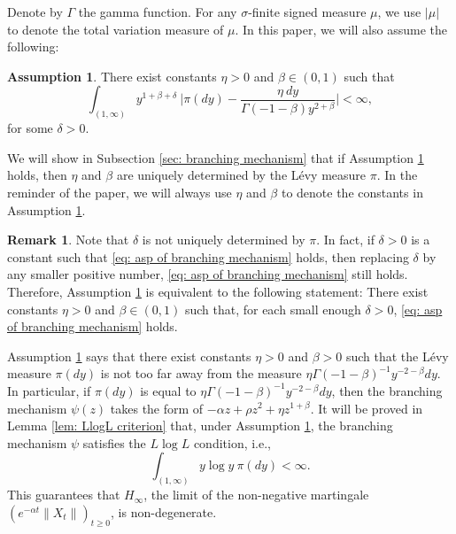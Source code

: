 \documentclass[12pt,a4paper]{amsart}
\theoremstyle{plain}
\theoremstyle{definition}
\newtheorem{rem}[thm]{Remark}
\newtheorem{asp}{Assumption}
\numberwithin{equation}{section}
\begin{document}
    Denote by $\Gamma$ the gamma function.
For any $\sigma$-finite signed measure $\mu$, we use $|\mu|$ to denote the total variation measure of $\mu$.
    In this paper, we will also assume the following:
\begin{asp}
\label{asp: branching mechanism}
    There exist constants $\eta > 0$ and $\beta \in (0,1)$ such that
\begin{equation}
\label{eq: asp of branching mechanism}
    \int_{(1,\infty)}y^{1+\beta +\delta}~\Big|\pi(dy)-\frac{\eta~dy}{\Gamma(-1-\beta)y^{2+\beta}}\Big| <\infty,
\end{equation}
	for some $\delta > 0$.
\end{asp}
	We will show in Subsection \ref{sec: branching mechanism} that if Assumption \ref{asp: branching mechanism} holds, then $\eta$ and $\beta$ are uniquely determined by the L\'evy measure $\pi$.
	In the reminder of the paper, we will always use $\eta$ and $\beta$ to denote the constants in Assumption  \ref{asp: branching mechanism}.


\begin{rem}
\label{rem: small enough delta}
	Note that $\delta$ is not uniquely determined by $\pi$.
	In fact, if $\delta>0$ is a constant such that \eqref{eq: asp of branching mechanism} holds, then replacing $\delta$ by any smaller positive number, \eqref{eq: asp of branching mechanism} still holds.
	Therefore, Assumption \ref{asp: branching mechanism} is equivalent to the following statement: 
	There exist constants $\eta > 0$ and $\beta \in (0,1)$ such that, for each small enough $\delta>0$, \eqref{eq: asp of branching mechanism} holds.
\end{rem}

    Assumption \ref{asp: branching mechanism} says that
 there exist constants $\eta>0$ and $\beta > 0$
    such that the L\'evy measure $\pi(dy)$ is not too far away from the measure $\eta \Gamma(-1-\beta)^{-1}y^{-2-\beta} dy$.
    In particular, if $\pi(dy)$ is equal to $\eta \Gamma(-1-\beta)^{-1}y^{-2-\beta} dy$, then the branching mechanism $\psi(z)$
    takes the form of
	$-\alpha z + \rho z^2 + \eta z^{1+\beta}$.
	It will be proved in Lemma \ref{lem: LlogL criterion} that, under Assumption
	\ref{asp: branching mechanism}, the branching mechanism $\psi$ satisfies the
	$L \log L$ condition, i.e.,
\[
	\int_{(1,\infty)} y\log y~\pi(dy) < \infty.
\]
    This guarantees that $H_\infty$, the limit of the non-negative martingale $(e^{-\alpha t} \|X_t\|)_{t\geq 0}$, is non-degenerate.
\end{document}
